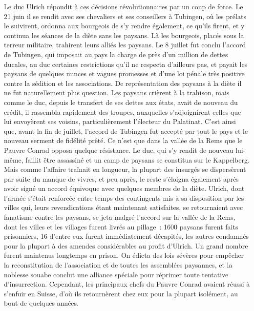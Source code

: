 \documentclass[french,twoside]{book} %
\begin{document}
Le duc Ulrich répondit à ces décisions révolutionnaires par un coup de force. Le 21 juin il se rendit avec ses chevaliers et ses conseillers à Tubingen, où les prélats le suivirent, ordonna aux bourgeois de s’y rendre également, ce qu’ils firent, et y continua les séances de la diète sans les paysans. Là les bourgeois, placés sous la terreur militaire, trahirent leurs alliés les paysans. Le 8 juillet fut conclu l’accord de Tubingen, qui imposait au pays la charge de près d’un million de dettes ducales, au duc certaines restrictions qu’il ne respecta d’ailleurs pas, et payait les paysans de quelques minces et vagues promesses et d’une loi pénale très positive contre la sédition et les associations. De représentation des paysans à la diète il ne fut naturellement plus question. Les paysans crièrent à la trahison, mais comme le duc, depuis le transfert de ses dettes aux états, avait de nouveau du crédit, il rassembla rapidement des troupes, auxquelles s’adjoignirent celles que lui envoyèrent ses voisins, particulièrement l’électeur du Palatinat. C’est ainsi que, avant la fin de juillet, l’accord de Tubingen fut accepté par tout le pays et le nouveau serment de fidélité prêté. Ce n’est que dans la vallée de la Rems que le Pauvre Conrad opposa quelque résistance. Le duc, qui s’y rendit de nouveau lui-même, faillit être assassiné et un camp de paysans se constitua sur le Kappelberg. Mais comme l’affaire traînait en longueur, la plupart des insurgés se dispersèrent par suite du manque de vivres, et peu après, le reste s’éloigna également après avoir signé un accord équivoque avec quelques membres de la diète. Ulrich, dont l’armée s’était renforcée entre temps des contingents mis à sa disposition par les villes qui, leurs revendications étant maintenant satisfaites, se retournaient avec fanatisme contre les paysans, se jeta malgré l’accord sur la vallée de la Rems, dont les villes et les villages furent livrés au pillage : 1600 paysans furent faits prisonniers, 16 d’entre eux furent immédiatement décapités, les autres condamnés pour la plupart à des amendes considérables au profit d’Ulrich. Un grand nombre furent maintenus longtemps en prison. On édicta des lois sévères pour empêcher la reconstitution de l’association et de toutes les assemblées paysannes, et la noblesse souabe conclut une alliance spéciale pour réprimer toute tentative d’insurrection. Cependant, les principaux chefs du Pauvre Conrad avaient réussi à s’enfuir en Suisse, d’où ils retournèrent chez eux pour la plupart isolément, au bout de quelques années.\par
\end{document}
